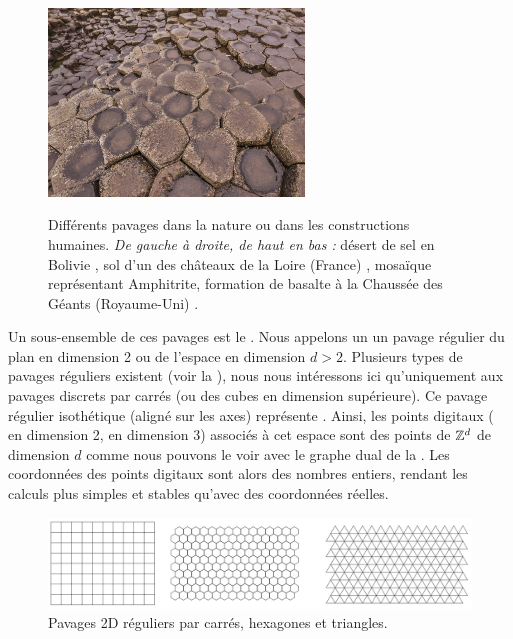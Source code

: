 \begin{figure}[ht]
\begin{center}
    \includegraphics[width=6.8cm]{images/Notions/pavage_chaussee_des_geants}\\
    \caption[Différents pavages dans la nature ou dans les constructions humaines]
    {Différents pavages dans la nature ou dans les constructions humaines.
    \emph{De gauche à droite, de haut en bas :} désert de sel en Bolivie
    \cite{pavage1}, sol d'un des châteaux de la Loire (France) \cite{pavage2},
    mosaïque représentant Amphitrite, formation de basalte à la Chaussée des
    Géants (Royaume-Uni) \cite{pavage4}.\label{fig:pavage-exemple}}
  \end{center}
\end{figure}

Un sous-ensemble de ces pavages est le . Nous appelons
un  un pavage régulier du plan en dimension 2 ou de
l'espace en dimension $d > 2$. Plusieurs types de pavages réguliers existent
(voir la ), nous nous intéressons ici qu'uniquement aux
pavages discrets par carrés (ou des cubes en dimension supérieure). Ce pavage
régulier isothétique (aligné sur les axes) représente . Ainsi, les points digitaux ( en dimension 2,
 en dimension 3) associés à cet espace sont des points de
$\mathbb{Z}^d$ de dimension $d$ comme nous pouvons le voir avec le graphe dual de la
. Les coordonnées des points digitaux sont alors des
nombres entiers, rendant les calculs plus simples et stables qu'avec des
coordonnées réelles.


\begin{figure}[ht]
  \begin{center}
    \includegraphics[width=14cm]{images/Notions/Pavages}
    \caption{Pavages 2D réguliers par carrés, hexagones et triangles.\label{fig:pavages}}
  \end{center}
\end{figure}

